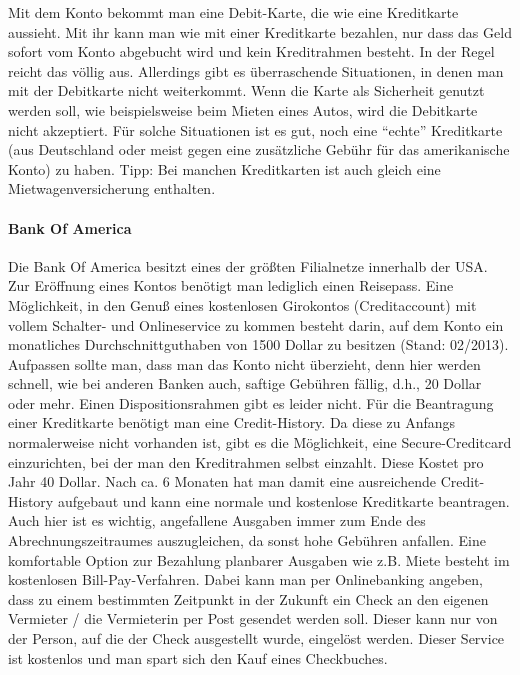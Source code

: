 \documentclass[a4paper]{scrreprt}
\begin{document}
Mit dem Konto bekommt man eine Debit-Karte, die wie eine Kreditkarte aussieht. Mit ihr kann man wie mit einer Kreditkarte bezahlen, nur dass das Geld sofort vom Konto abgebucht wird und kein Kreditrahmen besteht. In der Regel reicht das völlig aus. Allerdings gibt es überraschende Situationen, in denen man mit der Debitkarte nicht weiterkommt. Wenn die Karte als Sicherheit genutzt werden soll, wie beispielsweise beim Mieten eines Autos, wird die Debitkarte nicht akzeptiert. Für solche Situationen ist es gut, noch eine "`echte"' Kreditkarte (aus Deutschland oder meist gegen eine zusätzliche Gebühr für das amerikanische Konto) zu haben. Tipp: Bei manchen Kreditkarten ist auch gleich eine Mietwagenversicherung enthalten.

\paragraph{Bank Of America}  %
Die Bank Of America besitzt eines der gr\"o\ss{}ten Filialnetze innerhalb der USA. Zur Er\"offnung eines Kontos ben\"otigt man lediglich einen Reisepass. Eine M\"oglichkeit, in den Genu\ss{} eines kostenlosen Girokontos (Creditaccount) mit vollem Schalter- und Onlineservice zu kommen besteht darin, auf dem Konto ein monatliches Durchschnittguthaben von 1500 Dollar zu besitzen (Stand: 02/2013). Aufpassen sollte man, dass man das Konto nicht \"uberzieht, denn hier werden schnell, wie bei anderen Banken auch, saftige Geb\"uhren f\"allig, d.h., 20 Dollar oder mehr. Einen Dispositionsrahmen gibt es leider nicht. F\"ur die Beantragung einer Kreditkarte ben\"otigt man eine Credit-History. Da diese zu Anfangs normalerweise nicht vorhanden ist, gibt es die M\"oglichkeit, eine Secure-Creditcard einzurichten, bei der man den Kreditrahmen selbst einzahlt. Diese Kostet pro Jahr 40 Dollar. Nach ca. 6 Monaten hat man damit eine ausreichende Credit-History aufgebaut und kann eine normale und kostenlose Kreditkarte beantragen. Auch hier ist es wichtig, angefallene Ausgaben immer zum Ende des Abrechnungszeitraumes auszugleichen, da sonst hohe Geb\"uhren anfallen.
Eine komfortable Option zur Bezahlung planbarer Ausgaben wie z.B. Miete besteht im kostenlosen Bill-Pay-Verfahren. Dabei kann man per Onlinebanking angeben, dass zu einem bestimmten Zeitpunkt in der Zukunft ein Check an den eigenen Vermieter / die Vermieterin per Post gesendet werden soll. Dieser kann nur von der Person, auf die der Check ausgestellt wurde, eingel\"ost werden. Dieser Service ist kostenlos und man spart sich den Kauf eines Checkbuches.
\end{document}
